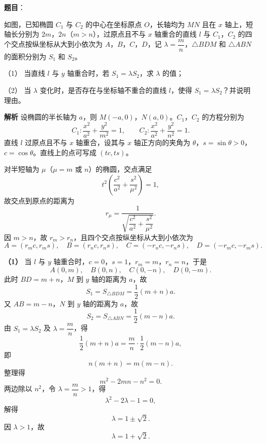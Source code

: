 \begin{answer}

\textbf{题目}：

如图，已知椭圆 $C_1$ 与 $C_2$ 的中心在坐标原点 $O$，长轴均为 $MN$ 且在 $x$ 轴上，短轴长分别为 $2m$，$2n$（$m>n$），过原点且不与 $x$ 轴重合的直线 $l$ 与 $C_1$，$C_2$ 的四个交点按纵坐标从大到小依次为 $A$，$B$，$C$，$D$，记 $\lambda=\dfrac mn$，$\triangle BDM$ 和 $\triangle ABN$ 的面积分别为 $S_1$ 和 $S_2$。
\nopagebreak[4]
\begin{center}\end{center}
\nopagebreak[4]
（1） 当直线 $l$ 与 $y$ 轴重合时，若 $S_1=\lambda S_2$，求 $\lambda$ 的值；

（2） 当 $\lambda$ 变化时，是否存在与坐标轴不重合的直线 $l$，使得 $S_1=\lambda S_2$？并说明理由。

\textbf{解析}
设椭圆的半长轴为 $a$，则 $M(-a,0)$，$N(a,0)$。$C_1$，$C_2$ 的方程分别为
\nopagebreak[4]
\[C_1:\frac{x^2}{a^2}+\frac{y^2}{m^2}=1,\qquad
C_2:\frac{x^2}{a^2}+\frac{y^2}{n^2}=1.\]
直线 $l$ 过原点且不与 $x$ 轴重合，设其与 $x$ 轴正方向的夹角为 $\theta$，$s=\sin\theta>0$，$c=\cos\theta$。直线上的点可写成 $(tc,ts)$。

对半短轴为 $\mu$（$\mu=m$ 或 $n$）的椭圆，交点满足
\nopagebreak[4]
\[t^2\left(\frac{c^2}{a^2}+\frac{s^2}{\mu^2}\right)=1,\]
故交点到原点的距离为
\nopagebreak[4]
\[r_\mu=\frac1{\sqrt{\dfrac{c^2}{a^2}+\dfrac{s^2}{\mu^2}}}.\]
因 $m>n$，故 $r_m>r_n$，且四个交点按纵坐标从大到小依次为
\nopagebreak[4]
\[A=(r_mc,r_ms),\quad B=(r_nc,r_ns),\quad C=(-r_nc,-r_ns),\quad D=(-r_mc,-r_ms).\]

\textbf{（1）} 当 $l$ 与 $y$ 轴重合时，$c=0$，$s=1$，$r_m=m$，$r_n=n$，于是
\nopagebreak[4]
\[A(0,m),\quad B(0,n),\quad C(0,-n),\quad D(0,-m).\]
此时 $BD=m+n$，$M$ 到 $y$ 轴的距离为 $a$，故
\nopagebreak[4]
\[S_1=S_{\triangle BDM}=\frac12(m+n)a.\]
又 $AB=m-n$，$N$ 到 $y$ 轴的距离为 $a$，故
\nopagebreak[4]
\[S_2=S_{\triangle ABN}=\frac12(m-n)a.\]
由 $S_1=\lambda S_2$ 及 $\lambda=\dfrac mn$，得
\nopagebreak[4]
\[\frac12(m+n)a=\frac mn\cdot\frac12(m-n)a,\]
即
\nopagebreak[4]
\[n(m+n)=m(m-n).\]
整理得
\nopagebreak[4]
\[m^2-2mn-n^2=0.\]
两边除以 $n^2$，令 $\lambda=\dfrac mn>1$，得
\nopagebreak[4]
\[\lambda^2-2\lambda-1=0,\]
解得
\nopagebreak[4]
\[\lambda=1\pm\sqrt2.\]
因 $\lambda>1$，故
\nopagebreak[4]
\[\lambda=1+\sqrt2.\]


\end{answer}
